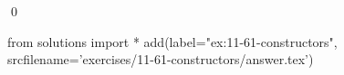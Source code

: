 
\begin{ex}
  \label{ex:11-61-constructors}
  
  \qed
\end{ex}
\begin{python0}
from solutions import *
add(label="ex:11-61-constructors",
    srcfilename='exercises/11-61-constructors/answer.tex')
\end{python0}
